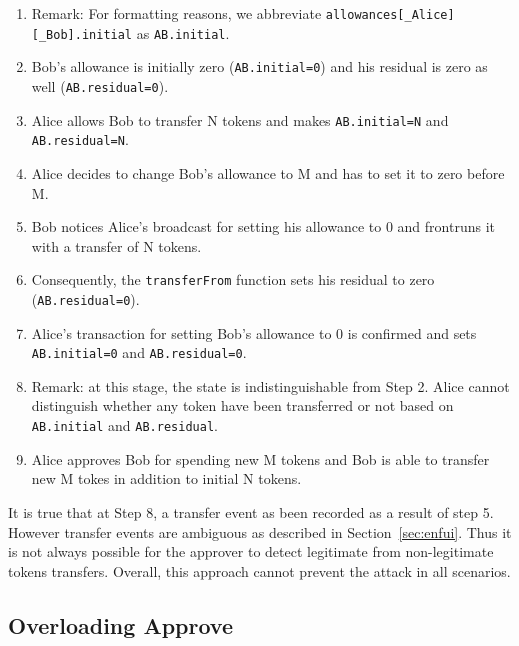 \begin{enumerate}
	\item Remark: For formatting reasons, we abbreviate \texttt{allowances[\_Alice][\_Bob].initial} as \texttt{AB.initial}.
	\item Bob’s allowance is initially zero (\texttt{AB.initial=0}) and his residual is zero as well (\texttt{AB.residual=0}).
	\item Alice allows Bob to transfer N tokens and makes \texttt{AB.initial=N} and \texttt{AB.residual=N}.
	\item Alice decides to change Bob’s allowance to M and has to set it to zero before M.
	\item Bob notices Alice’s broadcast for setting his allowance to 0 and frontruns it with a transfer of N tokens.
	\item Consequently, the \texttt{transferFrom} function sets his residual to zero (\texttt{AB.residual=0}).
	\item Alice’s transaction for setting Bob's allowance to 0 is confirmed and sets \texttt{AB.initial=0} and \texttt{AB.residual=0}.
	\item Remark: at this stage, the state is indistinguishable from Step 2. Alice cannot distinguish whether any token have been transferred or not based on \texttt{AB.initial} and \texttt{AB.residual}. 
	\item Alice approves Bob for spending new M tokens and Bob is able to transfer new M tokes in addition to initial N tokens.
\end{enumerate}

It is true that at Step 8, a transfer event as been recorded as a result of step 5. However transfer events are ambiguous as described in Section~\ref{sec:enfui}. Thus it is not always possible for the approver to detect legitimate from non-legitimate tokens transfers. Overall, this approach cannot prevent the attack in all scenarios. 


\subsection{Overloading Approve}
\label{sec:overload}


